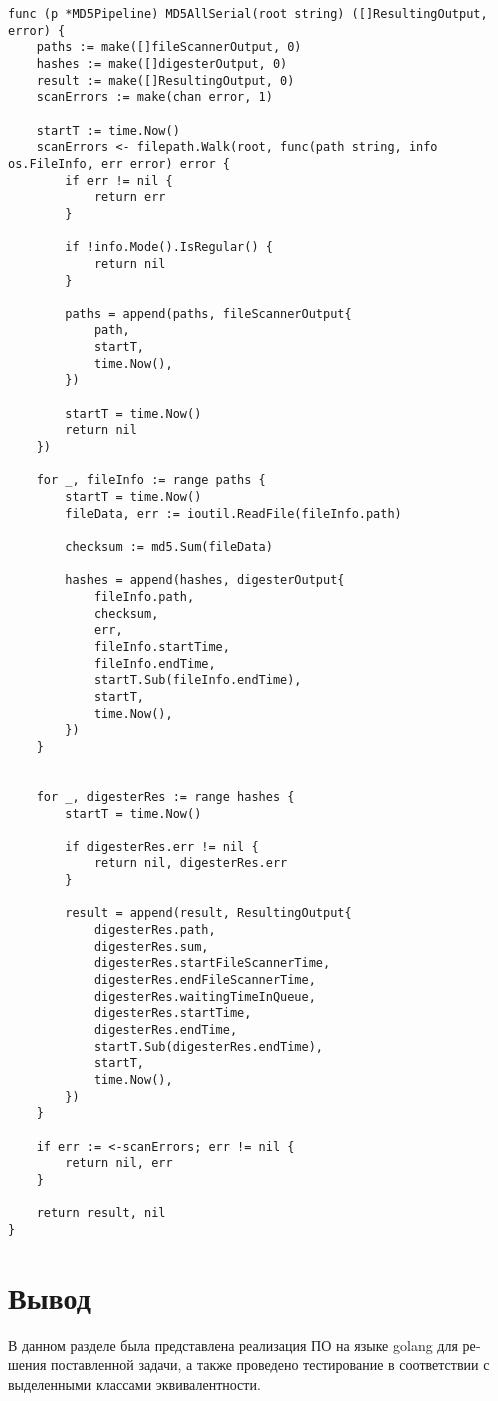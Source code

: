 \begin{lstlisting}[label=lst:serial,caption={Последовательная версия программы}]
func (p *MD5Pipeline) MD5AllSerial(root string) ([]ResultingOutput, error) {
	paths := make([]fileScannerOutput, 0)
	hashes := make([]digesterOutput, 0)
	result := make([]ResultingOutput, 0)
	scanErrors := make(chan error, 1)

	startT := time.Now()
	scanErrors <- filepath.Walk(root, func(path string, info os.FileInfo, err error) error {
		if err != nil {
			return err
		}

		if !info.Mode().IsRegular() {
			return nil
		}

		paths = append(paths, fileScannerOutput{
			path,
			startT,
			time.Now(),
		})

		startT = time.Now()
		return nil
	})

	for _, fileInfo := range paths {
		startT = time.Now()
		fileData, err := ioutil.ReadFile(fileInfo.path)

		checksum := md5.Sum(fileData)

		hashes = append(hashes, digesterOutput{
			fileInfo.path,
			checksum,
			err,
			fileInfo.startTime,
			fileInfo.endTime,
			startT.Sub(fileInfo.endTime),
			startT,
			time.Now(),
		})
	}


	for _, digesterRes := range hashes {
		startT = time.Now()

		if digesterRes.err != nil {
			return nil, digesterRes.err
		}

		result = append(result, ResultingOutput{
			digesterRes.path,
			digesterRes.sum,
			digesterRes.startFileScannerTime,
			digesterRes.endFileScannerTime,
			digesterRes.waitingTimeInQueue,
			digesterRes.startTime,
			digesterRes.endTime,
			startT.Sub(digesterRes.endTime),
			startT,
			time.Now(),
		})
	}

	if err := <-scanErrors; err != nil {
		return nil, err
	}

	return result, nil
}
\end{lstlisting}


\section{Вывод}
В данном разделе была представлена реализация ПО на языке golang для ре­шения 
поставленной задачи, а также проведено тестирование в соответствии с 
выделенными классами эквивалентности.